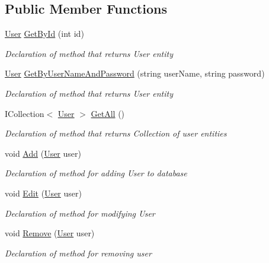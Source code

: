 \subsection*{Public Member Functions}
\begin{DoxyCompactItemize}
\item 
\mbox{\hyperlink{class_gielda_l2_1_1_d_b_1_1_entities_1_1_user}{User}} \mbox{\hyperlink{interface_gielda_l2_1_1_d_b_1_1_interfaces_1_1_i_user_repository_ae3b2e6d986054c6b336887b4d0d1cfac}{Get\+By\+Id}} (int id)
\begin{DoxyCompactList}\small\item\em Declaration of method that returns User entity \end{DoxyCompactList}\item 
\mbox{\hyperlink{class_gielda_l2_1_1_d_b_1_1_entities_1_1_user}{User}} \mbox{\hyperlink{interface_gielda_l2_1_1_d_b_1_1_interfaces_1_1_i_user_repository_a8a8920b50795c07316baf914e70f5ee3}{Get\+By\+User\+Name\+And\+Password}} (string user\+Name, string password)
\begin{DoxyCompactList}\small\item\em Declaration of method that returns User entity \end{DoxyCompactList}\item 
I\+Collection$<$ \mbox{\hyperlink{class_gielda_l2_1_1_d_b_1_1_entities_1_1_user}{User}} $>$ \mbox{\hyperlink{interface_gielda_l2_1_1_d_b_1_1_interfaces_1_1_i_user_repository_ada0fb28a6665ffc0191086563dbeb28e}{Get\+All}} ()
\begin{DoxyCompactList}\small\item\em Declaration of method that returns Collection of user entities \end{DoxyCompactList}\item 
void \mbox{\hyperlink{interface_gielda_l2_1_1_d_b_1_1_interfaces_1_1_i_user_repository_afd1f24172cd7dd824feb7d1d67ff9475}{Add}} (\mbox{\hyperlink{class_gielda_l2_1_1_d_b_1_1_entities_1_1_user}{User}} user)
\begin{DoxyCompactList}\small\item\em Declaration of method for adding User to database \end{DoxyCompactList}\item 
void \mbox{\hyperlink{interface_gielda_l2_1_1_d_b_1_1_interfaces_1_1_i_user_repository_a65d2dc63fea742354209b2e13a15a452}{Edit}} (\mbox{\hyperlink{class_gielda_l2_1_1_d_b_1_1_entities_1_1_user}{User}} user)
\begin{DoxyCompactList}\small\item\em Declaration of method for modifying User \end{DoxyCompactList}\item 
void \mbox{\hyperlink{interface_gielda_l2_1_1_d_b_1_1_interfaces_1_1_i_user_repository_ad353a86a583d55065532459823c413f2}{Remove}} (\mbox{\hyperlink{class_gielda_l2_1_1_d_b_1_1_entities_1_1_user}{User}} user)
\begin{DoxyCompactList}\small\item\em Declaration of method for removing user \end{DoxyCompactList}\end{DoxyCompactItemize}
